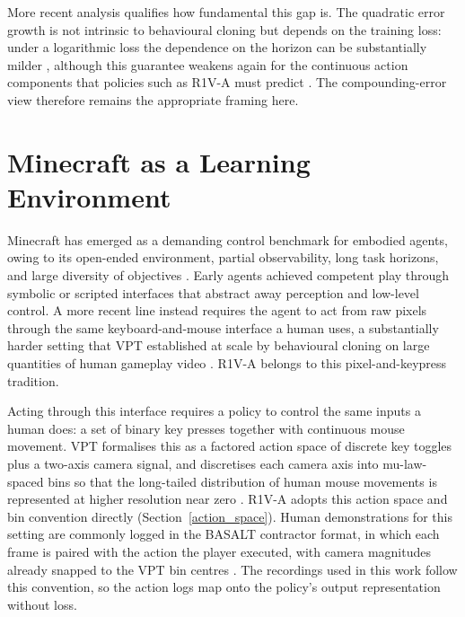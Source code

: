 More recent analysis qualifies how fundamental this gap is. The quadratic
error growth is not intrinsic to behavioural cloning but depends on the
training loss: under a logarithmic loss the dependence on the horizon can be
substantially milder \cite{foster2024horizon}, although this guarantee
weakens again for the continuous action components that policies such as
R1V-A must predict \cite{simchowitz2025pitfalls}. The compounding-error view
therefore remains the appropriate framing here.


\section{Minecraft as a Learning Environment}
\label{sec:bg-minecraft}
Minecraft has emerged as a demanding control benchmark for embodied agents,
owing to its open-ended environment, partial observability, long task
horizons, and large diversity of objectives \cite{fan2022minedojo}. Early
agents achieved competent play through symbolic or scripted interfaces that
abstract away perception and low-level control. A more recent line instead
requires the agent to act from raw pixels through the same
keyboard-and-mouse interface a human uses, a substantially harder setting
that VPT established at scale by behavioural cloning on large quantities of
human gameplay video \cite{baker2022vpt}. R1V-A belongs to this
pixel-and-keypress tradition.

Acting through this interface requires a policy to control the same inputs a
human does: a set of binary key presses together with continuous mouse
movement. VPT formalises this as a factored action space of discrete key
toggles plus a two-axis camera signal, and discretises each camera axis into
mu-law-spaced bins so that the long-tailed distribution of human mouse
movements is represented at higher resolution near zero \cite{baker2022vpt}.
R1V-A adopts this action space and bin convention directly
(Section~\ref{action_space}). Human demonstrations for this setting are
commonly logged in the BASALT contractor format, in which each frame is
paired with the action the player executed, with camera magnitudes already
snapped to the VPT bin centres \cite{shah2021basalt}. The recordings used in
this work follow this convention, so the action logs map onto the policy's
output representation without loss.


